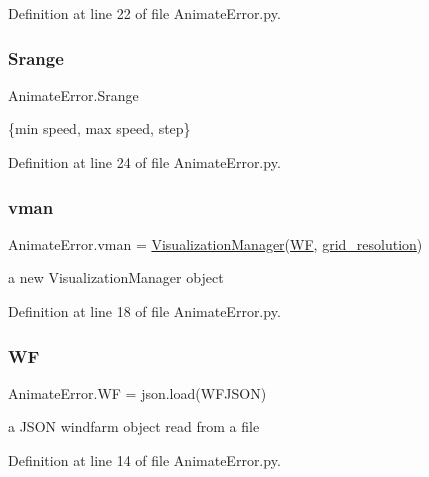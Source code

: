 Definition at line 22 of file Animate\+Error.\+py.

\mbox{\label{namespace_animate_error_ac77d30dc25adc76497daa19a97612665}} 
\subsubsection{\texorpdfstring{Srange}{Srange}}
{\footnotesize\ttfamily Animate\+Error.\+Srange}



\{min speed, max speed, step\} 



Definition at line 24 of file Animate\+Error.\+py.

\mbox{\label{namespace_animate_error_a7c61e5c3dcf8f34394aafe41966b8bf5}} 
\subsubsection{\texorpdfstring{vman}{vman}}
{\footnotesize\ttfamily Animate\+Error.\+vman = \mbox{\hyperlink{classvisualization__manager___d_j_1_1_visualization_manager}{Visualization\+Manager}}(\mbox{\hyperlink{namespace_animate_error_a25b033c46671da0b48bee3587cf370c1}{WF}}, \mbox{\hyperlink{namespace_animate_error_a80b6ca5f039907594eec504621ef9574}{grid\+\_\+resolution}})}



a new Visualization\+Manager object 



Definition at line 18 of file Animate\+Error.\+py.

\mbox{\label{namespace_animate_error_a25b033c46671da0b48bee3587cf370c1}} 
\subsubsection{\texorpdfstring{WF}{WF}}
{\footnotesize\ttfamily Animate\+Error.\+WF = json.\+load(W\+F\+J\+S\+ON)}



a J\+S\+ON windfarm object read from a file 



Definition at line 14 of file Animate\+Error.\+py.

